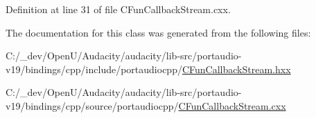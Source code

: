 Definition at line 31 of file C\+Fun\+Callback\+Stream.\+cxx.



The documentation for this class was generated from the following files\+:\begin{DoxyCompactItemize}
\item 
C\+:/\+\_\+dev/\+Open\+U/\+Audacity/audacity/lib-\/src/portaudio-\/v19/bindings/cpp/include/portaudiocpp/\hyperlink{_c_fun_callback_stream_8hxx}{C\+Fun\+Callback\+Stream.\+hxx}\item 
C\+:/\+\_\+dev/\+Open\+U/\+Audacity/audacity/lib-\/src/portaudio-\/v19/bindings/cpp/source/portaudiocpp/\hyperlink{_c_fun_callback_stream_8cxx}{C\+Fun\+Callback\+Stream.\+cxx}\end{DoxyCompactItemize}
